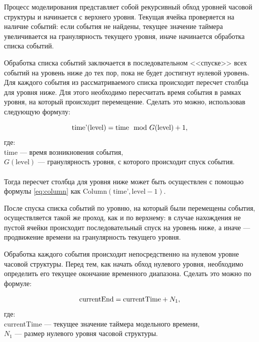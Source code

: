 Процесс моделирования представляет собой рекурсивный обход уровней часовой структуры и начинается с верхнего уровня. Текущая ячейка проверяется на наличие событий: если события не найдены, текущее значение таймера увеличивается на гранулярность текущего уровня, иначе начинается обработка списка событий.

Обработка списка событий заключается в последовательном <<спуске>> всех событий на уровень ниже до тех пор, пока не будет достигнут нулевой уровень. Для каждого события из рассматриваемого списка происходит пересчет столбца для уровня ниже. Для этого необходимо пересчитать время события в рамках уровня, на который происходит перемещение. Сделать это можно, использовав следующую формулу:

\begin{equation}
	\text{time'}(\text{level}) =  \text{time} \mod G(\text{level}) + 1 {,} \\
\end{equation}
где: \\
time --- время возникновения события, \\
$G(\text{level})$ --- гранулярность уровня, с которого происходит спуск события. \\ \\

Тогда пересчет столбца для уровня ниже может быть осуществлен с помощью формулы \ref{eq:column} как $\text{Column}(\text{time'}, \text{level} - 1)$.

После спуска списка событий по уровню, на который были перемещены события, осуществляется такой же проход, как и по верхнему: в случае нахождения не пустой ячейки происходит последовательный спуск на уровень ниже, а иначе --- продвижение времени на гранулярность текущего уровня.

Обработка каждого события происходит непосредственно на нулевом уровне часовой структуры. Перед тем, как начать обход нулевого уровня, необходимо определить его текущее окончание временного диапазона. Сделать это можно по формуле:

\begin{equation}
	\text{currentEnd} = \text{currentTime} + N_1 {,} \\
\end{equation}
где: \\
currentTime --- текущее значение таймера модельного времени, \\
$N_1 $ --- размер нулевого уровня часовой структуры. \\ \\

